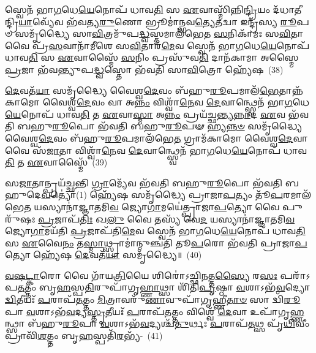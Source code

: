 𑌸𑍍𑌵𑍇𑌨᳴ 𑌭𑌾\-\ul{𑌗}\-𑌧𑍇\-\ul{𑌯𑍇}\-𑌨𑍋𑌪᳴ 𑌧𑌾𑌵\-\ul{𑌤𑌿} 𑌸 \ul{𑌏}\-𑌵𑌾𑌸𑍍𑌮𑌿᳴𑌨𑍍𑌨𑌿\-\ul{𑌨𑍍𑌦𑍍𑌰𑌿}\-𑌯𑌂 𑌦᳴𑌧𑌾𑌤𑍀𑌨𑍍𑌦𑍍𑌰𑌿\-\ul{𑌯𑌾}\-𑌵𑍍𑌯𑍇᳴𑌵 𑌭᳴𑌵𑌤𑍍𑌯\-\ul{𑌰𑍁}\-𑌣𑍋 𑌭𑍍𑌰𑍂𑌮𑌾॑𑌨𑍍𑌭𑌵\-\ul{𑌤𑍍𑌯𑍇}\-𑌤𑌦𑍍𑌵𑌾 𑌇𑌨𑍍𑌦𑍍𑌰᳴𑌸𑍍𑌯 \ul{𑌰𑍂}\-𑌪𑍞 𑌸𑌮𑍃᳴𑌦𑍍𑌧𑍍𑌯𑍈 𑌸𑌾\-\ul{𑌵𑌿}\-𑌤𑍍𑌰𑌮𑍁᳴𑌪\-\-\ul{𑌦𑍍𑌧𑍍𑌵}\-𑌸𑍍𑌤𑌮𑌾𑌲᳴𑌭𑍇𑌤 \ul{𑌸}\-𑌨𑌿𑌕𑌾᳴𑌮𑌃 𑌸\-\ul{𑌵𑌿}\-𑌤𑌾 𑌵𑍈 𑌪𑍍𑌰᳴\-\ul{𑌸}\-𑌵𑌾𑌨𑌾᳴𑌮𑍀𑌶𑍇 𑌸\-\ul{𑌵𑌿}\-𑌤𑌾𑌰᳴\-\ul{𑌮𑍇}\-𑌵 𑌸𑍍𑌵𑍇𑌨᳴ 𑌭𑌾\-\ul{𑌗}\-𑌧𑍇\-\ul{𑌯𑍇}\-𑌨𑍋𑌪᳴ 𑌧𑌾𑌵\-\ul{𑌤𑌿} 𑌸 \ul{𑌏}\-𑌵𑌾𑌸𑍍𑌮𑍈᳴ \ul{𑌸}\-𑌨𑌿𑌂 𑌪𑍍𑌰𑌸𑍁᳴𑌵\-\ul{𑌤𑌿} 𑌦𑌾𑌨᳴𑌕𑌾𑌮𑌾 𑌅𑌸𑍍𑌮𑍈 \ul{𑌪𑍍𑌰}\-𑌜𑌾 𑌭᳴𑌵𑌨𑍍𑌤𑍍𑌯𑍁𑌪\-\ul{𑌦𑍍𑌧𑍍𑌵}\-𑌸𑍍𑌤𑍋 𑌭᳴𑌵𑌤𑌿 𑌸𑌾\-\ul{𑌵𑌿}\-𑌤𑍍𑌰𑍋 𑌹𑍍𑌯𑍇᳴𑌷~(38)

\-\ul{𑌦𑍇}\-𑌵𑌤᳴\-\ul{𑌯𑌾} 𑌸𑌮𑍃᳴𑌦𑍍𑌧𑍍𑌯𑍈 𑌵𑍈𑌶𑍍𑌵\-\ul{𑌦𑍇}\-𑌵𑌂 𑌬᳴𑌹𑍁\-\ul{𑌰𑍂}\-𑌪𑌮𑌾𑌲᳴\-\ul{𑌭𑍇}\-𑌤𑌾𑌨𑍍𑌨᳴𑌕𑌾𑌮𑍋 𑌵𑍈𑌶𑍍𑌵\-\ul{𑌦𑍇}\-𑌵𑌂 𑌵𑌾 𑌅\-\ul{𑌨𑍍𑌨𑌂} 𑌵𑌿𑌶𑍍𑌵𑌾᳴\-\ul{𑌨𑍇}\-𑌵 \ul{𑌦𑍇}\-𑌵𑌾𑌨𑍍𑌥𑍍𑌸𑍍𑌵𑍇𑌨᳴ 𑌭𑌾\-\ul{𑌗}\-𑌧𑍇\-\ul{𑌯𑍇}\-𑌨𑍋𑌪᳴ 𑌧𑌾𑌵\-\ul{𑌤𑌿} 𑌤 \ul{𑌏}\-𑌵𑌾\-\ul{𑌸𑍍𑌮𑌾} 𑌅\-\ul{𑌨𑍍𑌨𑌂} 𑌪𑍍𑌰𑌯᳴𑌚𑍍𑌛𑌨𑍍𑌤𑍍𑌯\-\ul{𑌨𑍍𑌨𑌾}\-𑌦 \ul{𑌏}\-𑌵 𑌭᳴𑌵𑌤𑌿 𑌬𑌹𑍁\-\ul{𑌰𑍂}\-𑌪𑍋 𑌭᳴𑌵𑌤𑌿 𑌬𑌹𑍁\-\ul{𑌰𑍂}\-𑌪𑍟 𑌹𑍍𑌯\-\ul{𑌨𑍍𑌨}\-\-\ul{𑍞} 𑌸𑌮𑍃᳴𑌦𑍍𑌧𑍍𑌯𑍈 𑌵𑍈𑌶𑍍𑌵\-\ul{𑌦𑍇}\-𑌵𑌂 𑌬᳴𑌹𑍁\-\ul{𑌰𑍂}\-𑌪𑌮𑌾\-𑌲᳴𑌭𑍇\-\ul{𑌤} 𑌗𑍍𑌰𑌾𑌮᳴𑌕𑌾𑌮𑍋 𑌵𑍈𑌶𑍍𑌵\-\ul{𑌦𑍇}\-𑌵𑌾 𑌵𑍈 𑌸᳴\-\ul{𑌜𑌾}\-𑌤𑌾 𑌵𑌿𑌶𑍍𑌵𑌾᳴\-\ul{𑌨𑍇}\-𑌵 \ul{𑌦𑍇}\-𑌵𑌾𑌨𑍍𑌥𑍍𑌸𑍍𑌵𑍇𑌨᳴ 𑌭𑌾\-\ul{𑌗}\-𑌧𑍇\-\ul{𑌯𑍇}\-𑌨𑍋𑌪᳴ 𑌧𑌾𑌵\-\ul{𑌤𑌿} 𑌤 \ul{𑌏}\-𑌵𑌾𑌸𑍍𑌮𑍈᳴~(39)

𑌸\-\ul{𑌜𑌾}\-𑌤𑌾𑌨𑍍𑌪𑍍𑌰𑌯᳴𑌚𑍍𑌛𑌨𑍍𑌤𑌿 \ul{𑌗𑍍𑌰𑌾}\-𑌮𑍍𑌯𑍇᳴𑌵 𑌭᳴𑌵𑌤𑌿 𑌬𑌹𑍁\-\ul{𑌰𑍂}\-𑌪𑍋 𑌭᳴𑌵𑌤𑌿 𑌬𑌹𑍁𑌦𑍇\-\ul{𑌵}\-𑌤𑍍𑌯𑍋॑(1॒) 𑌹𑍍𑌯𑍇᳴𑌷 𑌸𑌮𑍃᳴𑌦𑍍𑌧𑍍𑌯𑍈 𑌪𑍍𑌰𑌾𑌜𑌾\-\ul{𑌪}\-𑌤𑍍𑌯𑌂 𑌤𑍂᳴\-\ul{𑌪}\-𑌰𑌮𑌾\-𑌲᳴𑌭𑍇\-\ul{𑌤} 𑌯𑌸𑍍𑌯𑌾𑌨𑌾॑𑌜𑍍𑌞𑌾𑌤𑌮𑌿\-\ul{𑌵} 𑌜𑍍𑌯𑍋\-\ul{𑌗𑌾}\-𑌮𑌯𑍇॑𑌤𑍍𑌪𑍍𑌰𑌾𑌜𑌾\-\ul{𑌪}\-𑌤𑍍𑌯𑍋 𑌵𑍈 𑌪𑍁𑌰𑍁᳴𑌷𑌃 \ul{𑌪𑍍𑌰}\-𑌜𑌾𑌪᳴\-\ul{𑌤𑌿𑌃} 𑌖\-\ul{𑌲𑍁} 𑌵𑍈 𑌤𑌸𑍍𑌯᳴ 𑌵𑍇\-\ul{𑌦} 𑌯𑌸𑍍𑌯𑌾𑌨𑌾॑𑌜𑍍𑌞𑌾𑌤𑌮𑌿\-\ul{𑌵} 𑌜𑍍𑌯𑍋\-\ul{𑌗𑌾}\-𑌮𑌯᳴𑌤𑌿 \ul{𑌪𑍍𑌰}\-𑌜𑌾𑌪᳴𑌤𑌿\-\ul{𑌮𑍇}\-𑌵 𑌸𑍍𑌵𑍇𑌨᳴ 𑌭𑌾\-\ul{𑌗}\-𑌧𑍇\-\ul{𑌯𑍇}\-𑌨𑍋𑌪᳴ 𑌧𑌾𑌵\-\ul{𑌤𑌿} 𑌸 \ul{𑌏}\-𑌵𑍈\-\ul{𑌨𑌂} 𑌤\-\ul{𑌸𑍍𑌮𑌾}\-𑌥𑍍𑌸𑍍𑌰𑌾𑌮𑌾॑𑌨𑍍𑌮𑍁𑌞𑍍𑌚𑌤𑌿 𑌤𑍂\-\ul{𑌪}\-𑌰𑍋 𑌭᳴𑌵𑌤𑌿 𑌪𑍍𑌰𑌾𑌜𑌾\-\ul{𑌪}\-𑌤𑍍𑌯𑍋 𑌹𑍍𑌯𑍇᳴𑌷 \ul{𑌦𑍇}\-𑌵𑌤᳴\-\ul{𑌯𑌾} 𑌸𑌮𑍃᳴𑌦𑍍𑌧𑍍𑌯𑍈॥~(40)

{\anuvakamend[{\-\ul{𑌅}\-\-\ul{𑌸𑍍𑌮𑌾} 𑌇𑌨𑍍𑌦𑍍𑌰᳴\-\ul{𑌮𑍇}\-𑌵𑍈𑌷 𑌸᳴\-\ul{𑌜𑌾}\-𑌤𑌾 𑌵𑌿𑌶𑍍𑌵𑌾᳴\-\ul{𑌨𑍇}\-𑌵 \ul{𑌦𑍇}\-𑌵𑌾𑌨𑍍𑌥𑍍𑌸𑍍𑌵𑍇𑌨᳴ 𑌭𑌾\-\ul{𑌗}\-𑌧𑍇\-\ul{𑌯𑍇}\-𑌨𑍋𑌪᳴ 𑌧𑌾𑌵\-\ul{𑌤𑌿} 𑌤 \ul{𑌏}\-𑌵𑌾𑌸𑍍𑌮𑍈॑ 𑌪𑍍𑌰𑌾𑌜𑌾\-\ul{𑌪}\-𑌤𑍍𑌯𑍋 𑌹𑌿 𑌤𑍍𑌰𑍀𑌣𑌿᳴ 𑌚}]}%

\-\ul{𑌵}\-\-\ul{𑌷}\-\-\ul{𑌟𑍍𑌕𑌾}\-𑌰𑍋 𑌵𑍈 𑌗𑌾᳴𑌯\-\ul{𑌤𑍍𑌰𑌿}\-𑌯𑍈 𑌶𑌿𑌰𑍋॑\-𑌽𑌚𑍍𑌛𑌿\-\ul{𑌨}\-𑌤𑍍𑌤\-\ul{𑌸𑍍𑌯𑍈} 𑌰\-\ul{𑌸𑌃} 𑌪𑌰𑌾᳴\-𑌽𑌪\-\ul{𑌤}\-𑌤𑍍𑌤𑌂 𑌬𑍃\-\ul{𑌹}\-𑌸𑍍𑌪\-\ul{𑌤𑌿}\-𑌰𑍁𑌪𑌾᳴𑌗𑍃\-\ul{𑌹𑍍𑌣𑌾}\-𑌥𑍍𑌸𑌾 𑌶𑌿᳴𑌤𑌿\-\ul{𑌪𑍃}\-𑌷𑍍𑌠𑌾 \ul{𑌵}\-𑌶𑌾\-𑌽𑌭᳴\-\ul{𑌵}\-𑌦𑍍𑌯𑍋 \ul{𑌦𑍍𑌵𑌿}\-𑌤𑍀𑌯𑌃᳴ \ul{𑌪}\-𑌰𑌾𑌪᳴\-\ul{𑌤}\-𑌤𑍍𑌤𑌂 \ul{𑌮𑌿}\-𑌤𑍍𑌰𑌾𑌵𑌰𑍁᳴\-\ul{𑌣𑌾}\-𑌵𑍁𑌪𑌾᳴𑌗𑍃𑌹𑍍𑌣𑍀\-\ul{𑌤𑌾}\-\-\ul{𑍞} 𑌸𑌾 𑌦𑍍𑌵𑌿᳴\-\ul{𑌰𑍂}\-𑌪𑌾 \ul{𑌵}\-𑌶𑌾\-𑌽𑌭᳴\-\ul{𑌵}\-𑌦𑍍𑌯\-\ul{𑌸𑍍𑌤𑍃}\-𑌤𑍀𑌯𑌃᳴ \ul{𑌪}\-𑌰𑌾𑌪᳴\-\ul{𑌤}\-𑌤𑍍𑌤𑌂 𑌵𑌿𑌶𑍍𑌵𑍇᳴ \ul{𑌦𑍇}\-𑌵𑌾 𑌉𑌪𑌾᳴𑌗𑍃\-\ul{𑌹𑍍𑌣}\-𑌨𑍍𑌥𑍍𑌸𑌾 𑌬᳴𑌹𑍁\-\ul{𑌰𑍂}\-𑌪𑌾 \ul{𑌵}\-𑌶𑌾\-𑌽𑌭᳴\-\ul{𑌵}\-𑌦𑍍𑌯𑌶𑍍𑌚᳴\-\ul{𑌤𑍁}\-𑌰𑍍𑌥𑌃 \ul{𑌪}\-𑌰𑌾𑌪᳴\-\ul{𑌤}\-𑌥𑍍𑌸 𑌪𑍃᳴\-\ul{𑌥𑌿}\-𑌵𑍀𑌂 𑌪𑍍𑌰𑌾𑌵𑌿᳴\-\ul{𑌶}\-𑌤𑍍𑌤𑌂 𑌬𑍃\-\ul{𑌹}\-𑌸𑍍𑌪𑌤𑌿᳴\-\ul{𑌰}\-𑌭𑍍𑌯᳴-~(41)

